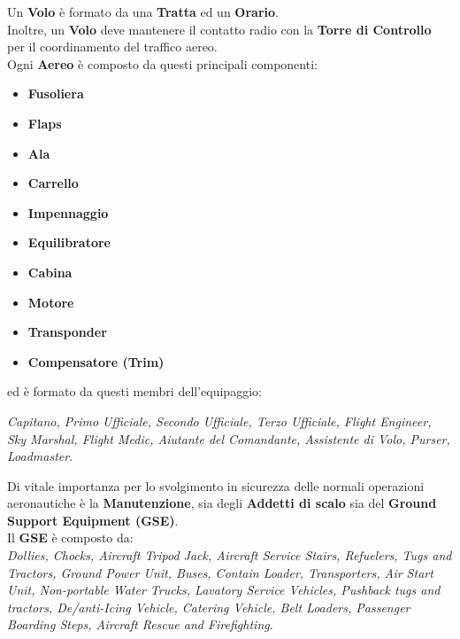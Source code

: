 \textsf{\small Un \textbf{Volo} è formato da una \textbf{Tratta} ed un \textbf{Orario}.}\\

\textsf{\small Inoltre, un \textbf{Volo} deve mantenere il contatto radio con la \textbf{Torre di Controllo} per il coordinamento del traffico aereo.}\\

\textsf{\small Ogni \textbf{Aereo} è composto da questi principali componenti:}

\begin{itemize}
	\item \textbf{\small Fusoliera}
	\item \textbf{\small Flaps}
	\item \textbf{\small Ala}
	\item \textbf{\small Carrello}
	\item \textbf{\small Impennaggio}
	\item \textbf{\small Equilibratore}
	\item \textbf{\small Cabina}
	\item \textbf{\small Motore}
	\item \textbf{\small Transponder}
	\item \textbf{\small Compensatore (Trim)}
\end{itemize}

\textsf{\small ed è formato da questi membri dell'equipaggio:}

\textsf{\small \emph{Capitano, Primo Ufficiale, Secondo Ufficiale, Terzo Ufficiale, Flight Engineer, Sky Marshal, Flight Medic, Aiutante del Comandante, Assistente di Volo, Purser, Loadmaster}.} \break

\textsf{\small Di vitale importanza per lo svolgimento in sicurezza delle normali operazioni aeronautiche è la \textbf{Manutenzione}, sia degli \textbf{Addetti di scalo} sia del \textbf{Ground Support Equipment (GSE)}.}\\

\textsf{\small Il \textbf{GSE} è composto da: }\\

\textsf{\small \emph{ Dollies, Chocks, Aircraft Tripod Jack, Aircraft Service Stairs, Refuelers, Tugs and Tractors, Ground Power Unit, Buses, Contain Loader, Transporters, Air Start Unit, Non-portable Water Trucks, Lavatory Service Vehicles, Pushback tugs and tractors, De/anti-Icing Vehicle, Catering Vehicle, Belt Loaders, Passenger Boarding Steps, Aircraft Rescue and Firefighting}.}\\

